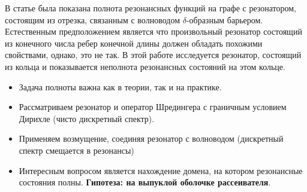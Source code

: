 \startprefacepage




В статье \cite{popov_exner70} была показана полнота резонансных функций на графе с резонатором, состоящим из отрезка, связанным с волноводом $\delta$-образным барьером. Естественным предположением является что произвольный резонатор состоящий из конечного числа ребер конечной длины должен обладать похожими свойствами, однако, это не так. В этой работе исследуется резонатор, состоящий из кольца и показывается неполнота резонансных состояний на этом кольце.


\begin{itemize}
\item Задача полноты важна как в теории, так и на практике.

\item Рассматриваем резонатор и оператор Шредингера с граничным условием Дирихле (чисто дискретный спектр).

\item Применяем возмущение, соединяя резонатор с волноводом (дискретный спектр смещается в резонансы)

\item Интересным вопросом является нахождение домена, на котором резонансные состояния полны. \textbf{Гипотеза: на выпуклой оболочке рассеивателя}.
\end{itemize}

